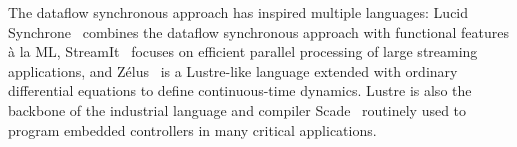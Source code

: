 The dataflow synchronous approach has inspired
multiple languages: \textsf{Lucid Synchrone}~\cite{lucid_2006} combines the
dataflow synchronous approach with functional features \`a la ML,
\textsf{StreamIt}~\cite{thies_et_al_2002} focuses on efficient parallel processing of large
streaming applications, and \textsf{Z\'elus}~\cite{zelus_2013} is a Lustre-like
language extended with ordinary differential equations to define
contin\-uous-time dynamics. Lustre is also the backbone of the
industrial language and compiler \textsf{Scade}~\cite{scade_2017} routinely
used to program embedded controllers in many critical applications.

